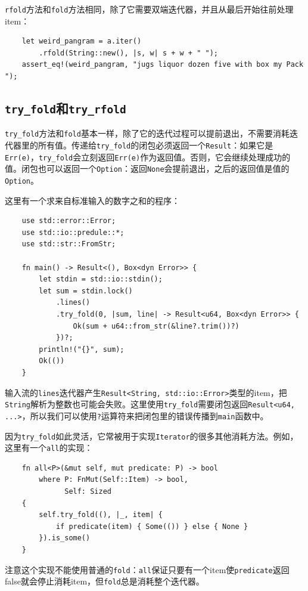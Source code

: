 \texttt{rfold}方法和\texttt{fold}方法相同，除了它需要双端迭代器，并且从最后开始往前处理item：
\begin{verbatim}
    let weird_pangram = a.iter()
        .rfold(String::new(), |s, w| s + w + " ");
    assert_eq!(weird_pangram, "jugs liquor dozen five with box my Pack ");
\end{verbatim}

\subsection{\texttt{try\_fold}和\texttt{try\_rfold}}
\texttt{try\_fold}方法和\texttt{fold}基本一样，除了它的迭代过程可以提前退出，不需要消耗迭代器里的所有值。传递给\texttt{try\_fold}的闭包必须返回一个\texttt{Result}：如果它是\texttt{Err(e)}，\texttt{try\_fold}会立刻返回\texttt{Err(e)}作为返回值。否则，它会继续处理成功的值。闭包也可以返回一个\texttt{Option}：返回\texttt{None}会提前退出，之后的返回值是值的\texttt{Option}。

这里有一个求来自标准输入的数字之和的程序：
\begin{verbatim}
    use std::error::Error;
    use std::io::predule::*;
    use std::str::FromStr;

    fn main() -> Result<(), Box<dyn Error>> {
        let stdin = std::io::stdin();
        let sum = stdin.lock()
            .lines()
            .try_fold(0, |sum, line| -> Result<u64, Box<dyn Error>> {
                Ok(sum + u64::from_str(&line?.trim())?)
            })?;
        println!("{}", sum);
        Ok(())
    }
\end{verbatim}

输入流的\texttt{lines}迭代器产生\texttt{Result<String, std::io::Error>}类型的item，把\texttt{String}解析为整数也可能会失败。这里使用\texttt{try\_fold}需要闭包返回\texttt{Result<u64, ...>}，所以我们可以使用\texttt{?}运算符来把闭包里的错误传播到\texttt{main}函数中。

因为\texttt{try\_fold}如此灵活，它常被用于实现\texttt{Iterator}的很多其他消耗方法。例如，这里有一个\texttt{all}的实现：
\begin{verbatim}
    fn all<P>(&mut self, mut predicate: P) -> bool
        where P: FnMut(Self::Item) -> bool,
              Self: Sized
    {
        self.try_fold((), |_, item| {
            if predicate(item) { Some(()) } else { None }
        }).is_some()
    }
\end{verbatim}

注意这个实现不能使用普通的\texttt{fold}：\texttt{all}保证只要有一个item使\texttt{predicate}返回false就会停止消耗item，但\texttt{fold}总是消耗整个迭代器。

